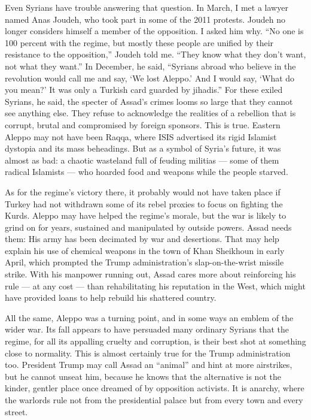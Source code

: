 Even Syrians have trouble answering that question. In March, I met a
lawyer named Anas Joudeh, who took part in some of the 2011 protests.
Joudeh no longer considers himself a member of the opposition. I asked
him why. ``No one is 100 percent with the regime, but mostly these
people are unified by their resistance to the opposition,'' Joudeh told
me. ``They know what they don't want, not what they want.'' In December,
he said, ``Syrians abroad who believe in the revolution would call me
and say, `We lost Aleppo.' And I would say, `What do you mean?' It was
only a Turkish card guarded by jihadis.'' For these exiled Syrians, he
said, the specter of Assad's crimes looms so large that they cannot see
anything else. They refuse to acknowledge the realities of a rebellion
that is corrupt, brutal and compromised by foreign sponsors. This is
true. Eastern Aleppo may not have been Raqqa, where ISIS advertised its
rigid Islamist dystopia and its mass beheadings. But as a symbol of
Syria's future, it was almost as bad: a chaotic wasteland full of
feuding militias --- some of them radical Islamists --- who hoarded food
and weapons while the people starved.

As for the regime's victory there, it probably would not have taken
place if Turkey had not withdrawn some of its rebel proxies to focus on
fighting the Kurds. Aleppo may have helped the regime's morale, but the
war is likely to grind on for years, sustained and manipulated by
outside powers. Assad needs them: His army has been decimated by war and
desertions. That may help explain his use of chemical weapons in the
town of Khan Sheikhoun in early April, which prompted the Trump
administration's slap-on-the-wrist missile strike. With his manpower
running out, Assad cares more about reinforcing his rule --- at any cost
--- than rehabilitating his reputation in the West, which might have
provided loans to help rebuild his shattered country.

All the same, Aleppo was a turning point, and in some ways an emblem of
the wider war. Its fall appears to have persuaded many ordinary Syrians
that the regime, for all its appalling cruelty and corruption, is their
best shot at something close to normality. This is almost certainly true
for the Trump administration too. President Trump may call Assad an
``animal'' and hint at more airstrikes, but he cannot unseat him,
because he knows that the alternative is not the kinder, gentler place
once dreamed of by opposition activists. It is anarchy, where the
warlords rule not from the presidential palace but from every town and
every street.

